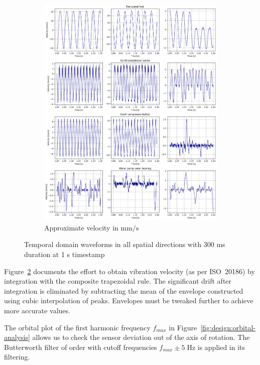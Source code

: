 \begin{figure}[ht]
\begin{subfigure}[b]{0.49\textwidth}
        \includegraphics[width=\textwidth]{assets/design/EDA-custom-dataset-velocity.png}
        \caption{Approximate velocity in $\mathrm{mm/s}$}
        \label{fig:design:preliminary-velocity}
    \end{subfigure} 
    \caption{Temporal domain waveforms in all spatial directions with 300 ms duration at 1 s timestamp}
\end{figure} 

Figure~\ref{fig:design:preliminary-velocity} documents the effort to obtain vibration velocity (as per ISO~20186) by integration with the composite trapezoidal rule. The significant drift after integration is eliminated by subtracting the mean of the envelope constructed using cubic interpolation of peaks. Envelopes must be tweaked further to achieve more accurate values.

The orbital plot of the first harmonic frequency $f_{max}$ in Figure~\ref{fig:design:orbital-analysis} allows us to check the sensor deviation out of the axis of rotation. The Butterworth filter of  order with cutoff frequencies $f_{max} \pm 5\;\mathrm{Hz}$ is applied in its filtering.

